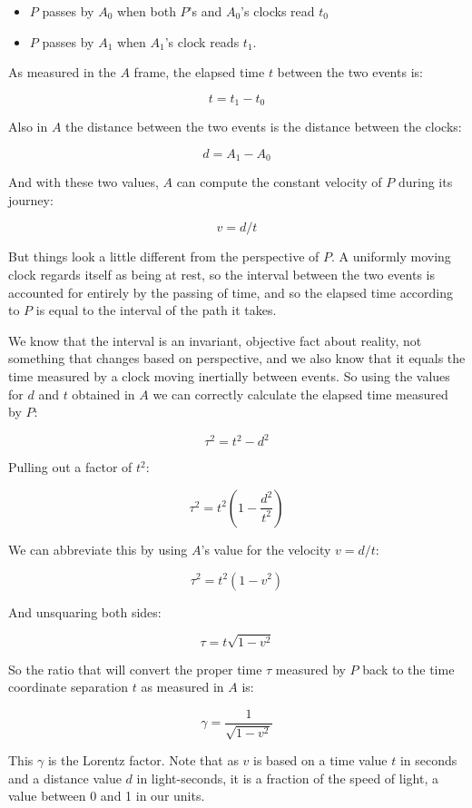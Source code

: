 \begin{itemize}
    \item $P$ passes by $A_0$ when both $P$'s and $A_0$'s clocks read $t_0$
    \item $P$ passes by $A_1$ when $A_1$'s clock reads $t_1$.
\end{itemize}

As measured in the $A$ frame, the elapsed time $t$ between the two events is:

$$t = t_1 - t_0$$

Also in $A$ the distance between the two events is the distance between the clocks:

$$d = A_1 - A_0$$

And with these two values, $A$ can compute the constant velocity of $P$ during its journey:

$$v = d/t$$

But things look a little different from the perspective of $P$. A uniformly moving clock regards itself as being at rest, so the interval between the two events is accounted for entirely by the passing of time, and so the elapsed time according to $P$ is equal to the interval of the path it takes.

We know that the interval is an invariant, objective fact about reality, not something that changes based on perspective, and we also know that it equals the time measured by a clock moving inertially between events. So using the values for $d$ and $t$ obtained in $A$ we can correctly calculate the elapsed time measured by $P$:

$$\tau^2 = t^2 - d^2$$

Pulling out a factor of $t^2$:

$$\tau^2 = t^2(1 - \frac{d^2}{t^2})$$

We can abbreviate this by using $A$'s value for the velocity $v = d/t$:

$$\tau^2 = t^2(1 - v^2)$$

And unsquaring both sides:

$$\tau = t\sqrt{1 - v^2}$$

So the ratio that will convert the proper time $\tau$ measured by $P$ back to the time coordinate separation $t$ as measured in $A$ is:

$$\gamma = \frac{1}{\sqrt{1 - v^2}}$$

This $\gamma$ is the Lorentz factor. Note that as $v$ is based on a time value $t$ in seconds and a distance value $d$ in light-seconds, it is a fraction of the speed of light, a value between 0 and 1 in our units.

